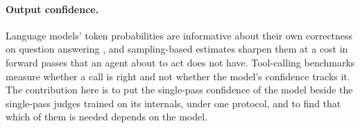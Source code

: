 \paragraph{Output confidence.}
Language models' token probabilities are informative about their own correctness on question answering \citep{kadavath2022know}, and sampling-based estimates sharpen them \citep{farquhar2024semantic,manakul2023selfcheckgpt} at a cost in forward passes that an agent about to act does not have. Tool-calling benchmarks measure whether a call is right \citep{patil2025bfcl,patil2024gorilla,qin2024toolllm} and not whether the model's confidence tracks it. The contribution here is to put the single-pass confidence of the model beside the single-pass judges trained on its internals, under one protocol, and to find that which of them is needed depends on the model.
